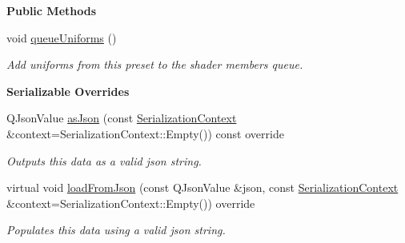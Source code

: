 \begin{Indent}\textbf{ Public Methods}\par
\begin{DoxyCompactItemize}
\item 
\mbox{\label{classrev_1_1_shader_preset_ac2932e1aaa271e83c8f1fc7153e6407a}} 
void \mbox{\hyperlink{classrev_1_1_shader_preset_ac2932e1aaa271e83c8f1fc7153e6407a}{queue\+Uniforms}} ()
\begin{DoxyCompactList}\small\item\em Add uniforms from this preset to the shader member\textquotesingle{}s queue. \end{DoxyCompactList}\end{DoxyCompactItemize}
\end{Indent}
\begin{Indent}\textbf{ Serializable Overrides}\par
\begin{DoxyCompactItemize}
\item 
\mbox{\label{classrev_1_1_shader_preset_a2354d904b39792aa7a586e321374a078}} 
Q\+Json\+Value \mbox{\hyperlink{classrev_1_1_shader_preset_a2354d904b39792aa7a586e321374a078}{as\+Json}} (const \mbox{\hyperlink{structrev_1_1_serialization_context}{Serialization\+Context}} \&context=Serialization\+Context\+::\+Empty()) const override
\begin{DoxyCompactList}\small\item\em Outputs this data as a valid json string. \end{DoxyCompactList}\item 
\mbox{\label{classrev_1_1_shader_preset_ac57b05ed77ae0a90de6fb8551f708bcf}} 
virtual void \mbox{\hyperlink{classrev_1_1_shader_preset_ac57b05ed77ae0a90de6fb8551f708bcf}{load\+From\+Json}} (const Q\+Json\+Value \&json, const \mbox{\hyperlink{structrev_1_1_serialization_context}{Serialization\+Context}} \&context=Serialization\+Context\+::\+Empty()) override
\begin{DoxyCompactList}\small\item\em Populates this data using a valid json string. \end{DoxyCompactList}\end{DoxyCompactItemize}
\end{Indent}
